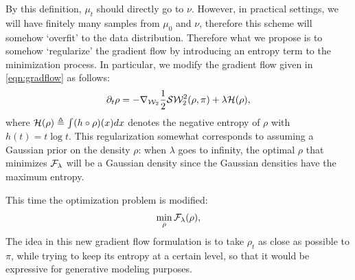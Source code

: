 
By this definition, $\mu_t$ should directly go to $\nu$. However, in practical settings, we will have finitely many samples from $\mu_0$ and $\nu$, therefore this scheme will somehow `overfit' to the data distribution. Therefore what we propose is to somehow `regularize' the gradient flow by introducing an entropy term to the minimization process. In particular, we modify the gradient flow given in \eqref{eqn:gradflow} as follows:
\begin{align}
\partial_t \rho = - \nabla_{{\cal W}_2} \frac1{2} {\cal S}{\cal W}_2^2(\rho, \pi) + \lambda {\cal H}(\rho),
\end{align}
where ${\cal H}(\rho) \triangleq \int (h \circ \rho) (x) dx $ denotes the negative entropy of $\rho$ with $h(t) = t \log t$. This regularization somewhat corresponds to assuming a Gaussian prior on the density $\rho$: when $\lambda$ goes to infinity, the optimal $\rho$ that minimizes ${\cal F}_\lambda$ will be a Gaussian density since the Gaussian densities have the maximum entropy.


This time the optimization problem is modified:
\begin{align}
\min_\rho {\cal F}_\lambda(\rho),
\end{align}
The idea in this new gradient flow formulation is to take $\rho_t$ as close as possible to $\pi$, while trying to keep its entropy at a certain level, so that it would be expressive for generative modeling purposes.



